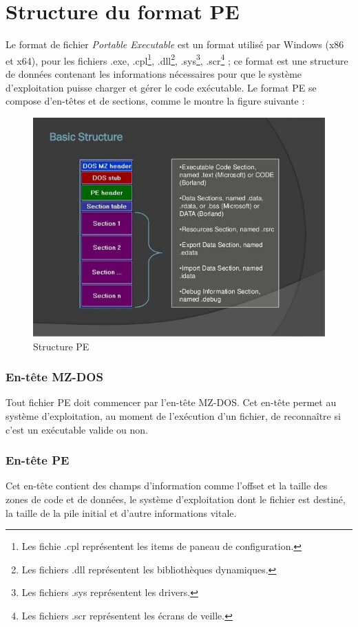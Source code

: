 \section{Structure du format PE}
Le format de fichier \emph{Portable Executable} \cite{pe1} est un format utilisé par Windows (x86 et x64), 
pour les fichiers .exe, .cpl\footnote{Les fichie .cpl représentent les items de paneau de configuration.}, 
.dll\footnote{Les fichiers .dll représentent les bibliothèques dynamiques.}, 
.sys\footnote{Les fichiers .sys représentent les drivers.}, 
.scr\footnote{Les fichiers .scr représentent les écrans de veille.} ;
ce format est une structure de données contenant les 
informations nécessaires pour que le système d’exploitation puisse charger et gérer le code 
exécutable.  Le format PE se compose d'en-têtes et de sections, comme le montre la figure suivante :
\begin{figure}[h]
    \centering
    \includegraphics[width=\linewidth]{images/pe_header.jpg}
    \caption{Structure PE}
\end{figure}

    \subsubsection{En-tête MZ-DOS}
    Tout fichier PE doit commencer par l'en-tête MZ-DOS. Cet en-tête permet au système d'exploitation, au 
    moment de l'exécution d'un fichier, de reconnaître si c'est un exécutable valide ou non. \cite{pe2}

    \subsubsection{En-tête PE}
    Cet en-tête contient des champs d'information comme l'offset et la taille des zones de code et de données, 
    le système d'exploitation dont le fichier est destiné, la taille de la pile initial et 
    d'autre informations vitale. \cite{pe3}

